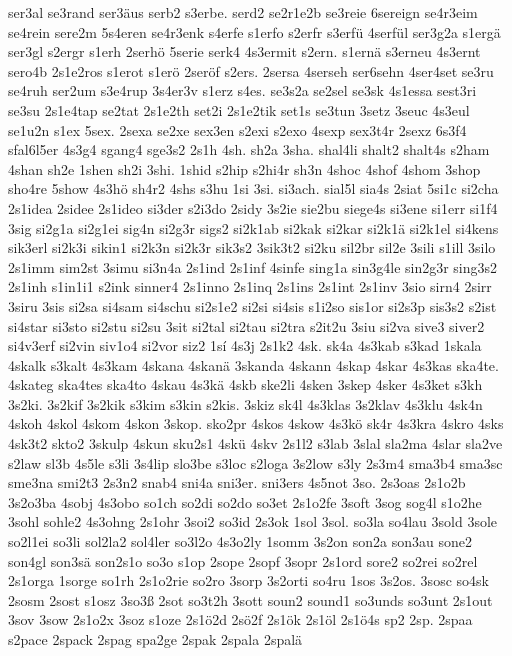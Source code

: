 {ser3al
se3rand
ser3äus
serb2
s3erbe.
serd2
se2r1e2b
se3reie
6sereign
se4r3eim
se4rein
sere2m
5s4eren
se4r3enk
s4erfe
s1erfo
s2erfr
s3erfü
4serfül
ser3g2a
s1ergä
ser3gl
s2ergr
s1erh
2serhö
5serie
serk4
4s3ermit
s2ern.
s1ernä
s3erneu
4s3ernt
sero4b
2s1e2ros
s1erot
s1erö
2seröf
s2ers.
2sersa
4serseh
ser6sehn
4ser4set
se3ru
se4ruh
ser2um
s3e4rup
3s4er3v
s1erz
s4es.
se3s2a
se2sel
se3sk
4s1essa
sest3ri
se3su
2s1e4tap
se2tat
2s1e2th
set2i
2s1e2tik
set1s
se3tun
3setz
3seuc
4s3eul
se1u2n
s1ex
5sex.
2sexa
se2xe
sex3en
s2exi
s2exo
4sexp
sex3t4r
2sexz
6s3f4
sfal6l5er
4s3g4
sgang4
sge3s2
2s1h
4sh.
sh2a
3sha.
shal4li
shalt2
shalt4s
s2ham
4shan
sh2e
1shen
sh2i
3shi.
1shid
s2hip
s2hi4r
sh3n
4shoc
4shof
4shom
3shop
sho4re
5show
4s3hö
sh4r2
4shs
s3hu
1si
3si.
si3ach.
sial5l
sia4s
2siat
5si1c
si2cha
2s1idea
2sidee
2s1ideo
si3der
s2i3do
2sidy
3s2ie
sie2bu
siege4s
si3ene
si1err
si1f4
3sig
si2g1a
si2g1ei
sig4n
si2g3r
sigs2
si2k1ab
si2kak
si2kar
si2k1ä
si2k1el
si4kens
sik3erl
si2k3i
sikin1
si2k3n
si2k3r
sik3s2
3sik3t2
si2ku
sil2br
sil2e
3sili
s1ill
3silo
2s1imm
sim2st
3simu
si3n4a
2s1ind
2s1inf
4sinfe
sing1a
sin3g4le
sin2g3r
sing3s2
2s1inh
s1in1i1
s2ink
sinner4
2s1inno
2s1inq
2s1ins
2s1int
2s1inv
3sio
sirn4
2sirr
3siru
3sis
si2sa
si4sam
si4schu
si2s1e2
si2si
si4sis
s1i2so
sis1or
si2s3p
sis3s2
s2ist
si4star
si3sto
si2stu
si2su
3sit
si2tal
si2tau
si2tra
s2it2u
3siu
si2va
sive3
siver2
si4v3erf
si2vin
siv1o4
si2vor
siz2
1sí
4s3j
2s1k2
4sk.
sk4a
4s3kab
s3kad
1skala
4skalk
s3kalt
4s3kam
4skana
4skanä
3skanda
4skann
4skap
4skar
4s3kas
ska4te.
4skateg
ska4tes
ska4to
4skau
4s3kä
4skb
ske2li
4sken
3skep
4sker
4s3ket
s3kh
3s2ki.
3s2kif
3s2kik
s3kim
s3kin
s2kis.
3skiz
sk4l
4s3klas
3s2klav
4s3klu
4sk4n
4skoh
4skol
4skom
4skon
3skop.
sko2pr
4skos
4skow
4s3kö
sk4r
4s3kra
4skro
4sks
4sk3t2
skto2
3skulp
4skun
sku2s1
4skü
4skv
2s1l2
s3lab
3slal
sla2ma
4slar
sla2ve
s2law
sl3b
4s5le
s3li
3s4lip
slo3be
s3loc
s2loga
3s2low
s3ly
2s3m4
sma3b4
sma3sc
sme3na
smi2t3
2s3n2
snab4
sni4a
sni3er.
sni3ers
4s5not
3so.
2s3oas
2s1o2b
3s2o3ba
4sobj
4s3obo
so1ch
so2di
so2do
so3et
2s1o2fe
3soft
3sog
sog4l
s1o2he
3sohl
sohle2
4s3ohng
2s1ohr
3soi2
so3id
2s3ok
1sol
3sol.
so3la
so4lau
3sold
3sole
so2l1ei
so3li
sol2la2
sol4ler
so3l2o
4s3o2ly
1somm
3s2on
son2a
son3au
sone2
son4gl
son3sä
son2s1o
so3o
s1op
2sope
2sopf
3sopr
2s1ord
sore2
so2rei
so2rel
2s1orga
1sorge
so1rh
2s1o2rie
so2ro
3sorp
3s2orti
so4ru
1sos
3s2os.
3sosc
so4sk
2sosm
2sost
s1osz
3so3ß
2sot
so3t2h
3sott
soun2
sound1
so3unds
so3unt
2s1out
3sov
3sow
2s1o2x
3soz
s1oze
2s1ö2d
2sö2f
2s1ök
2s1öl
2s1ö4s
sp2
2sp.
2spaa
s2pace
2spack
2spag
spa2ge
2spak
2spala
2spalä
}
